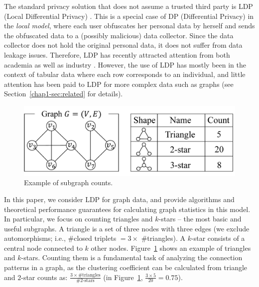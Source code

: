 The standard privacy solution that does not assume a trusted third party is LDP (Local Differential Privacy) \cite{Duchi_FOCS13,Kasiviswanathan_FOCS08}. 
This is a special case of DP 
(Differential Privacy) 
in the \textit{local model}, where each user obfuscates her personal data by herself and sends the obfuscated data to a (possibly malicious) data collector. 
Since the data collector does not hold the original personal data, it does not suffer from data leakage issues. 
Therefore, LDP has recently attracted attention from both academia \cite{Acharya_AISTATS19,Bassily_STOC15,Bassily_NIPS17,Fanti_PoPETs16,Kairouz_ICML16,Kairouz_JMLR16,Murakami_USENIX19,Qin_CCS16,Wang_USENIX17,Ye_ISIT17} as well as industry \cite{Erlingsson_CCS14,Ding_NIPS17,Thakurta_USPatent17}. 
However, the use of LDP has mostly been in the context of tabular data where each row corresponds to an individual, and little attention has been paid to LDP for more complex data such as graphs (see 
Section~\ref{chap1-sec:related} for details). 

\begin{figure}
\centering
\includegraphics[width=0.9\linewidth]{fig/subgraph.pdf}
\vspace{-5.8mm}
\caption{Example of subgraph counts.}
\label{chap1-fig:subgraph}
\end{figure}

In this paper, we consider LDP for graph data, and 
provide algorithms and theoretical performance guarantees
for calculating graph statistics in this model. 
In particular, we focus on counting triangles and $k$-stars -- the most basic and useful subgraphs. 
A triangle is a set of three nodes with three edges (we exclude automorphisms; i.e., \#closed triplets $= 3 \times$ \#triangles). 
A $k$-star consists of a central node connected to $k$ other nodes. 
Figure~\ref{chap1-fig:subgraph} shows an example of triangles and $k$-stars. 
Counting them is a fundamental task of analyzing the connection patterns in a graph, as 
the clustering coefficient can be calculated from triangle and $2$-star counts as: $\frac{3 \times \text{\#triangles}}{\#2\text{-stars}}$ (in Figure~\ref{chap1-fig:subgraph}, $\frac{3 \times 5}{20} = 0.75$). 


